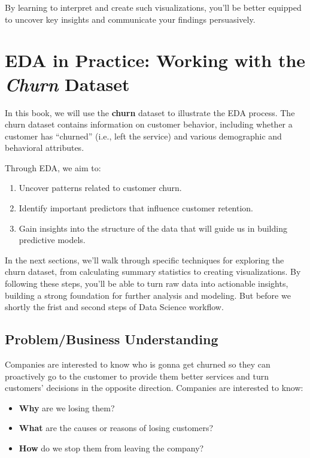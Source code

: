 \documentclass[
]{book}
\providecommand{\tightlist}{%
  \setlength{\itemsep}{0pt}\setlength{\parskip}{0pt}}
\theoremstyle{definition}
\theoremstyle{definition}
\theoremstyle{definition}
\theoremstyle{definition}
\theoremstyle{remark}
\begin{document}
By learning to interpret and create such visualizations, you'll be better equipped to uncover key insights and communicate your findings persuasively.

\section{\texorpdfstring{EDA in Practice: Working with the \emph{Churn} Dataset}{EDA in Practice: Working with the Churn Dataset}}\label{eda-in-practice-working-with-the-churn-dataset}

In this book, we will use the \textbf{churn} dataset to illustrate the EDA process. The churn dataset contains information on customer behavior, including whether a customer has ``churned'' (i.e., left the service) and various demographic and behavioral attributes.

Through EDA, we aim to:

\begin{enumerate}
\def\labelenumi{\arabic{enumi}.}
\tightlist
\item
  Uncover patterns related to customer churn.
\item
  Identify important predictors that influence customer retention.
\item
  Gain insights into the structure of the data that will guide us in building predictive models.
\end{enumerate}

In the next sections, we'll walk through specific techniques for exploring the churn dataset, from calculating summary statistics to creating visualizations. By following these steps, you'll be able to turn raw data into actionable insights, building a strong foundation for further analysis and modeling. But before we shortly the frist and second steps of Data Science workflow.

\subsection{Problem/Business Understanding}\label{problembusiness-understanding}

Companies are interested to know who is gonna get churned so they can proactively go to the customer to provide them better services and turn customers' decisions in the opposite direction. Companies are interested to know:

\begin{itemize}
\tightlist
\item
  \textbf{Why} are we losing them?
\item
  \textbf{What} are the causes or reasons of losing customers?
\item
  \textbf{How} do we stop them from leaving the company?
\end{itemize}
\end{document}
